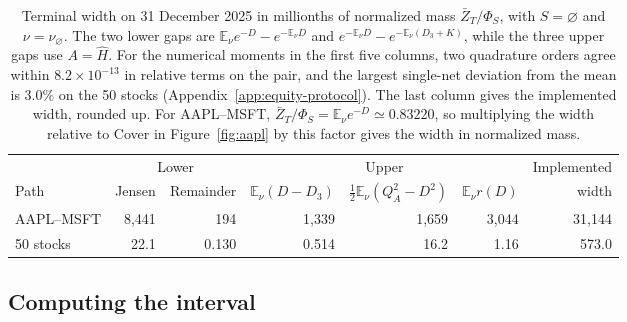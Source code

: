 \documentclass{article}
\numberwithin{equation}{section}
\theoremstyle{remark}
\newcommand{\E}{\mathbb E}
\begin{document}
\begin{table}[!htbp]
\centering\small\setlength{\tabcolsep}{4pt}
\caption{Terminal width on 31 December 2025 in millionths of normalized
mass $\bar Z_T/\Phi_S$, with $S=\varnothing$ and $\nu=\nu_\varnothing$.
The two lower gaps are $\E_\nu e^{-D}-e^{-\E_\nu D}$ and
$e^{-\E_\nu D}-e^{-\E_\nu(D_3+K)}$, while the three upper gaps use
$A=\widehat H$. For the numerical moments in the first five columns,
two quadrature orders agree within $8.2\times10^{-13}$ in relative terms
on the pair, and the largest single-net deviation from the mean is 3.0\%
on the 50 stocks (Appendix~\ref{app:equity-protocol}). The last column gives the
implemented width, rounded up. For AAPL--MSFT,
$\bar Z_T/\Phi_S=\E_\nu e^{-D}\simeq0.83220$, so multiplying the width
relative to Cover in Figure~\ref{fig:aapl} by this factor gives the width
in normalized mass.}
\label{tab:curvature-slack}
\begin{tabular}{lrrrrrr}
\toprule
 & \multicolumn{2}{c}{Lower} & \multicolumn{3}{c}{Upper} & Implemented\\
\cmidrule(lr){2-3}\cmidrule(lr){4-6}
Path & Jensen & Remainder & $\E_\nu(D-D_3)$ &
$\tfrac12\E_\nu(Q_A^2-D^2)$ & $\E_\nu r(D)$ & width\\
\midrule
AAPL--MSFT & 8,441 & 194 & 1,339 & 1,659 & 3,044 & 31,144\\
50 stocks & 22.1 & 0.130 & 0.514 & 16.2 & 1.16 & 573.0\\
\bottomrule
\end{tabular}
\end{table}

\subsection{Computing the interval}
\end{document}
